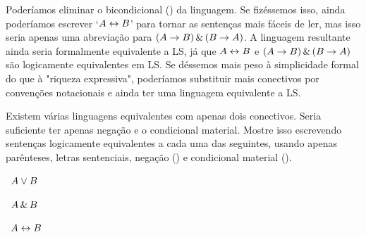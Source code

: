 \problempart
\label{pr.altConnectives}
Poderíamos eliminar o bicondicional (\eiff) da linguagem. Se fizéssemos isso, ainda poderíamos escrever `$A\leftrightarrow B$' para tornar as sentenças mais fáceis de ler, mas isso seria apenas uma abreviação para $(A\rightarrow B) \,\&\, (B\rightarrow A)$. A linguagem resultante ainda seria formalmente equivalente a LS, já que $A\leftrightarrow B$ e $(A\rightarrow B) \,\&\, (B\rightarrow A)$ são logicamente equivalentes em LS. Se déssemos mais peso à simplicidade formal do que à "riqueza expressiva", poderíamos substituir mais conectivos por convenções notacionais e ainda ter uma linguagem equivalente a LS.

Existem várias linguagens equivalentes com apenas dois conectivos. Seria suficiente ter apenas negação e o condicional material. Mostre isso escrevendo sentenças logicamente equivalentes a cada uma das seguintes, usando apenas parênteses, letras sentenciais, negação (\enot) e condicional material (\eif).
\begin{earg}
\item\leftsolutions\ $A\vee B$
\item\leftsolutions\ $A\,\&\, B$
\item\leftsolutions\ $A\leftrightarrow B$
\end{earg}

